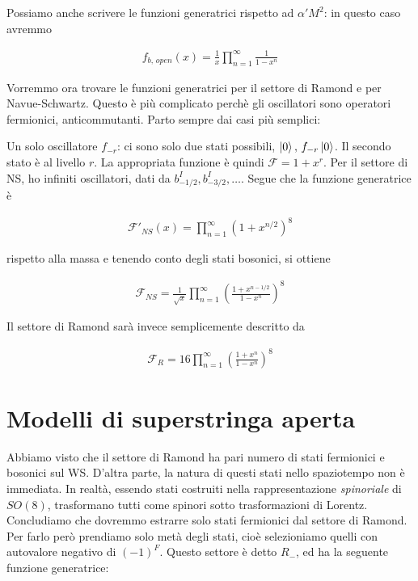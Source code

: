 \documentclass{report}
\begin{document}
Possiamo anche scrivere le funzioni generatrici rispetto ad \(\alpha' M^2\): in questo caso avremmo 

\begin{align}
    f_{b, \, open}(x) = \frac{1}{x}\prod_{n=1}^\infty \frac{1}{1-x^n}
\end{align}

Vorremmo ora trovare le funzioni generatrici per il settore di Ramond e per Navue-Schwartz. Questo è più complicato perchè gli oscillatori sono operatori fermionici, anticommutanti. Parto sempre dai casi più semplici: 

Un solo oscillatore \(f_{-r}\): ci sono solo due stati possibili, \(\ket{0}, \, f_{-r}\ket{0}\). Il secondo stato è al livello \(r\). La appropriata funzione è quindi \(\mathcal{F} = 1 + x^r\). Per il settore di NS, ho infiniti oscillatori, dati da \(b^I_{-1/2}, b_{-3/2}^I, \ldots\). Segue che la funzione generatrice è 

\begin{align}
    \mathcal{F}'_{NS}(x) = \prod_{n=1}^\infty (1+x^{n/2})^8 
\end{align}

rispetto alla massa e tenendo conto degli stati bosonici, si ottiene 

\begin{align}
    \mathcal{F}_{NS} = \frac{1}{\sqrt{x}}\prod_{n=1}^{\infty}\left( \frac{1+x^{n-1/2}}{1-x^n} \right)^8 
\end{align}

Il settore di Ramond sarà invece semplicemente descritto da 

\begin{align}
    \mathcal{F}_{R} = 16 \prod_{n=1}^\infty \left( \frac{1+x^n}{1-x^n} \right)^8 
\end{align}

\section{Modelli di superstringa aperta}

Abbiamo visto che il settore di Ramond ha pari numero di stati fermionici e bosonici sul WS. D'altra parte, la natura di questi stati nello spaziotempo non è immediata. In realtà, essendo stati costruiti nella rappresentazione \emph{spinoriale} di \(SO(8)\), trasformano tutti come spinori sotto trasformazioni di Lorentz. Concludiamo che dovremmo estrarre solo stati fermionici dal settore di Ramond. Per farlo però prendiamo solo metà degli stati, cioè selezioniamo quelli con autovalore negativo di \((-1)^F\). Questo settore è detto \(R_-\), ed ha la seguente funzione generatrice: 
\end{document}
